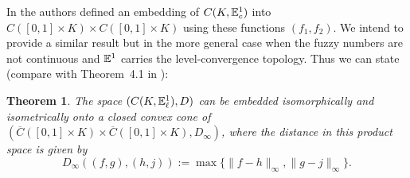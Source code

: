 \documentclass{amsart}
\newtheorem{theorem}{Theorem}[section]
\newcommand{\fn}{\mathbb{E}\sp{1}}
\begin{document}
In \cite{ACA:13} the authors defined an embedding of $C(K,\fn_{c})$ into $C([0,1]\times K)\times C([0,1]\times K)$ using these functions $(f_1,f_2)$. We intend to provide a similar result but in the more general case when the fuzzy numbers are not continuous and $\fn$ carries the level-convergence topology.
Thus we can state (compare with Theorem~4.1 in \cite{ACA:13}):
\begin{theorem}\label{th:embedding}
The space $(C(K,\fn_{\ell}),D)$ can be embedded isomorphically and isometrically onto a closed convex cone of  $(\overline{C}([0,1]\times K)\times \overline{C}([0,1]\times K),D_{\infty})$, where the distance in this product space is given by
$$D_{\infty}((f,g),(h,j)):=\max\{ \|f-h\|_{\infty}, \|g-j\|_{\infty}\}.$$

\end{theorem}
\end{document}
